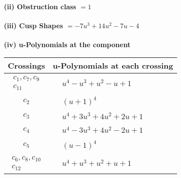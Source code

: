 \documentclass[1p]{elsarticle_modified}
\theoremstyle{definition}
\begin{document}
\flushleft \textbf{(ii) Obstruction class $= 1$}\\~\\
\flushleft \textbf{(iii) Cusp Shapes $= -7 u^3+14 u^2-7 u-4$}\\~\\
\newpage\renewcommand{\arraystretch}{1}
\flushleft \textbf{(iv) u-Polynomials at the component}\newline \\
\begin{tabular}{m{50pt}|m{274pt}}
Crossings & \hspace{64pt}u-Polynomials at each crossing \\
\hline $$\begin{aligned}c_{1},c_{7},c_{9}\\c_{11}\end{aligned}$$&$\begin{aligned}
&u^4- u^3+u^2- u+1
\end{aligned}$\\
\hline $$\begin{aligned}c_{2}\end{aligned}$$&$\begin{aligned}
&(u+1)^4
\end{aligned}$\\
\hline $$\begin{aligned}c_{3}\end{aligned}$$&$\begin{aligned}
&u^4+3 u^3+4 u^2+2 u+1
\end{aligned}$\\
\hline $$\begin{aligned}c_{4}\end{aligned}$$&$\begin{aligned}
&u^4-3 u^3+4 u^2-2 u+1
\end{aligned}$\\
\hline $$\begin{aligned}c_{5}\end{aligned}$$&$\begin{aligned}
&(u-1)^4
\end{aligned}$\\
\hline $$\begin{aligned}c_{6},c_{8},c_{10}\\c_{12}\end{aligned}$$&$\begin{aligned}
&u^4+u^3+u^2+u+1
\end{aligned}$\\
\hline
\end{tabular}\\~\\
\end{document}
